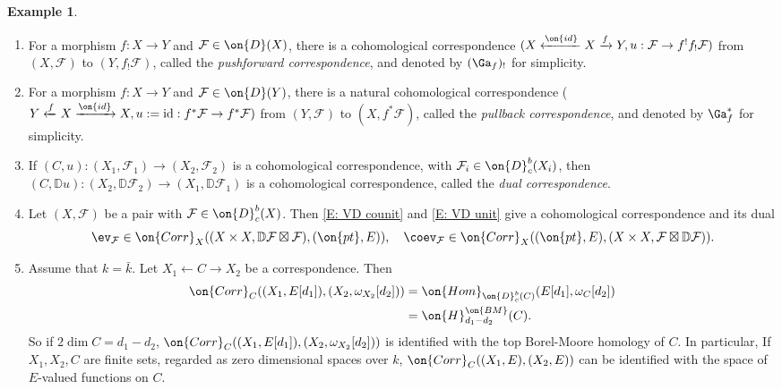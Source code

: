 \documentclass[11pt]{amsart}
\theoremstyle{definition}
\theoremstyle{definition}
\newtheorem{ex}[thm]{Example}
\theoremstyle{definition}
\numberwithin{equation}{subsection}
\newcommand{\bD}{{\mathbb D}}
\newcommand{\mF}{{\mathcal F}}
\newcommand{\Hom}{{\on{Hom}}}
\newcommand{\id}{{\on{id}}}
\begin{document}
\begin{ex}
\label{Ex:examples of correspondences}
\begin{enumerate}
\item For a morphism $f: X\to Y$ and $\mF \in \on{D}(X)$, there is a cohomological correspondence $(X\xleftarrow{\id}X\xrightarrow{f} Y, u:\mF\to f^!f_!\mF)$ from $(X,\mF)$ to $(Y,f_!\mF)$, called the \emph{pushforward correspondence}, and denoted by $(\Ga_f)_!$ for simplicity.

\item For a morphism $f: X\to Y$ and $\mF \in \on{D}(Y)$, there is a natural cohomological correspondence ($Y\xleftarrow{f} X\xrightarrow{\id} X, u:= \mathrm{id}:f^*\mF\to f^*\mF)$ from $(Y,\mF)$ to $(X,f^*\mF)$, called the \emph{pullback correspondence}, and denoted by $\Ga_f^*$ for simplicity.

\item If $(C,u): (X_1,\mF_1)\to (X_2,\mF_2)$ is a cohomological correspondence, with $\mF_i\in \on{D}_c^b(X_i)$, then $(C,\bD u): (X_2, \bD \mF_2)\to (X_1,\bD \mF_1)$ is a cohomological correspondence, called the \emph{dual correspondence}.

\item Let $(X,\mF)$ be a pair with $\mF\in \on{D}_c^b(X)$. Then \eqref{E: VD counit} and \eqref{E: VD unit} give a cohomological correspondence and its dual
$$ \ev_\mF\in \on{Corr}_{X}((X\times X, \bD\mF\boxtimes \mF),(\on{pt}, E)),\quad  \coev_\mF\in \on{Corr}_{X}((\on{pt}, E), (X\times X, \mF\boxtimes\bD\mF)).$$
 

\item Assume that $k=\bar k$. Let $X_1\leftarrow C\to X_2$ be a correspondence. Then 
\begin{equation*}
\label{E:corr and cycle}
\begin{split}
\on{Corr}_C((X_1,E[d_1]), (X_2, \omega_{X_2}[d_2]))&=\Hom_{\on{D}^b_c(C)}(E[d_1],\omega_C[d_2])\\
&=\on{H}^{\on{BM}}_{d_1-d_2}(C).
\end{split}
\end{equation*}
So if $2\dim C=d_1-d_2$, $\on{Corr}_C((X_1,E[d_1]), (X_2, \omega_{X_2}[d_2]))$ is identified with the top Borel-Moore homology of $C$. In particular,
If $X_1,X_2,C$ are finite sets, regarded as zero dimensional spaces over $k$,  $\on{Corr}_C((X_1,E),(X_2,E))$ can be identified with the space of $E$-valued functions on $C$. 
\end{enumerate}
\end{ex}
\end{document}
